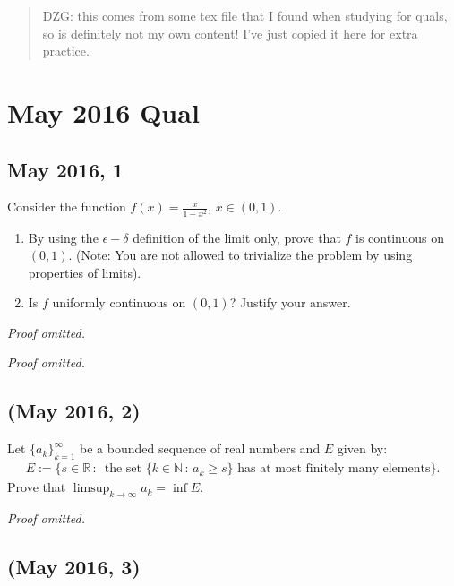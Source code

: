 \begin{quote}
DZG: this comes from some tex file that I found when studying for quals,
so is definitely not my own content! I've just copied it here for extra
practice.
\end{quote}

\hypertarget{may-2016-qual}{%
\section{May 2016 Qual}\label{may-2016-qual}}

\hypertarget{may-2016-1}{%
\subsection{May 2016, 1}\label{may-2016-1}}

Consider the function \(f(x) = \frac{x}{1-x^2}\), \(x \in (0,1)\).

\begin{enumerate}
\def\labelenumi{\arabic{enumi}.}
\item
  By using the \(\epsilon-\delta\) definition of the limit only, prove
  that \(f\) is continuous on \((0,1)\). (Note: You are not allowed to
  trivialize the problem by using properties of limits).
\item
  Is \(f\) uniformly continuous on \((0,1)\)? Justify your answer.
\end{enumerate}

\emph{Proof omitted.}

\emph{Proof omitted.}

\hypertarget{may-2016-2}{%
\subsection{(May 2016, 2)}\label{may-2016-2}}

Let \(\{a_k\}_{k=1}^\infty\) be a bounded sequence of real numbers and
\(E\) given by:
\begin{align*}E:= \bigg\{s \in \mathbb{R}\, \colon \, \text{ the set } \{k \in \mathbb{N}\, \colon \, a_k \geq s\} \text{ has at most finitely many elements}\bigg\}.\end{align*}
Prove that \(\limsup_{k \to \infty} a_k = \inf E\).

\emph{Proof omitted.}

\hypertarget{may-2016-3}{%
\subsection{(May 2016, 3)}\label{may-2016-3}}


